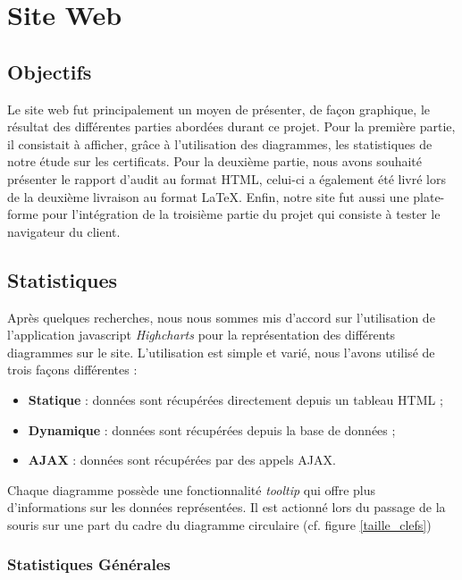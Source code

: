 \chapter{Site Web}

\section{Objectifs}

Le site web fut principalement un moyen de présenter, de façon graphique, le résultat des différentes parties abordées durant ce projet. Pour la première partie, il consistait à afficher, grâce à l'utilisation des diagrammes, les statistiques de notre étude sur les certificats. Pour la deuxième partie, nous avons souhaité présenter le rapport d'audit au format HTML, celui-ci a également été livré lors de la deuxième livraison au format LaTeX. Enfin, notre site fut aussi une plate-forme pour l'intégration de la troisième partie du projet qui consiste à tester le navigateur du client. \\


\section{Statistiques}

Après quelques recherches, nous nous sommes mis d'accord sur l'utilisation de l'application javascript \textit{Highcharts} pour la représentation des différents diagrammes sur le site. L'utilisation est simple et varié, nous l'avons utilisé de trois façons différentes : 
\begin{itemize}
\item \textbf{Statique} : données sont récupérées directement depuis un tableau HTML ;
\item \textbf{Dynamique} : données sont récupérées depuis la base de données ;
\item \textbf{AJAX} : données sont récupérées par des appels AJAX.\\
\end{itemize}

Chaque diagramme possède une fonctionnalité \textit{tooltip} qui offre plus d'informations sur les données représentées. Il est actionné lors du passage de la souris sur une part du cadre du diagramme circulaire (cf. figure \ref{taille_clefs})

\subsection{Statistiques Générales}

